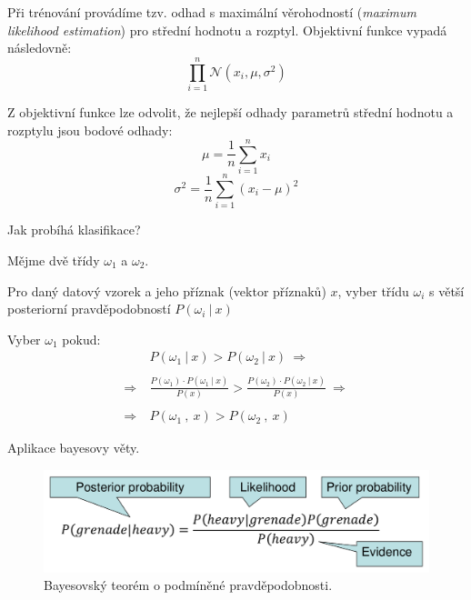 \begin{compactitem}
    \item Při trénování provádíme tzv. odhad s maximální věrohodností (\textit{maximum likelihood estimation}) pro střední hodnotu a rozptyl. Objektivní funkce vypadá následovně:
    $$ {\displaystyle \prod_{i=1}^{n} \mathcal{N}(x_i, \mu, \sigma^2)} $$

    \item Z objektivní funkce lze odvolit, že nejlepší odhady parametrů střední hodnotu a rozptylu jsou bodové odhady:
    $$ {\displaystyle \mu = \frac{1}{n} \sum_{i=1}^n x_i } $$
    $$ {\displaystyle \sigma^2 = \frac{1}{n} \sum_{i=1}^n (x_i - \mu)^2 } $$

    \item Jak probíhá klasifikace? \begin{compactitem}
        \item Mějme dvě třídy $\omega_1$ a $\omega_2$.

        \item Pro daný datový vzorek a jeho příznak (vektor příznaků) $x$, vyber třídu $\omega_i$ s větší posteriorní pravděpodobností $P(\omega_i ~|~ x)$

        \item Vyber $\omega_1$ pokud:
        \begin{equation}
            \begin{split}
                &P(\omega_1 ~|~ x) > P (\omega_2 ~|~ x) ~\Rightarrow~ \\
                \\
                ~\Rightarrow~ &\frac{P(\omega_1) \cdot P(\omega_1 ~|~ x)}{P(x)} > \frac{P(\omega_2) \cdot P(\omega_2 ~|~ x)}{P(x)} ~\Rightarrow~ \\
                \\
                ~\Rightarrow~ &P(\omega_1 ~,~ x) > P(\omega_2 ~,~ x)
            \end{split}
        \end{equation}

    \end{compactitem}

    \item Aplikace bayesovy věty.
    \begin{figure}[H]
        \centering
        \includegraphics[width=0.75\linewidth]{bayes.pdf}
        \caption{Bayesovský teorém o podmíněné pravděpodobnosti.}
    \end{figure}


\end{compactitem}
